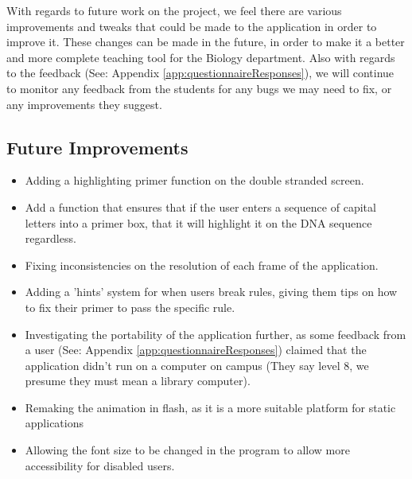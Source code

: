 
With regards to future work on the project, we feel there are various improvements and tweaks that could be made to the application in order to improve it. These changes can be made in the future, in order to make it a better and more complete teaching tool for the Biology department. Also with regards to the feedback (See: Appendix \ref{app:questionnaireResponses}), we will continue to monitor any feedback from the students for any bugs we may need to fix, or any improvements they suggest.

\subsection{Future Improvements}

\begin{itemize}

\item Adding a highlighting primer function on the double stranded screen.

\item Add a function that ensures that if the user enters a sequence of capital letters into a primer box, that it will highlight it on the DNA sequence regardless.

\item Fixing inconsistencies on the resolution of each frame of the application.

\item Adding a 'hints' system for when users break rules, giving them tips on how to fix their primer to pass the specific rule.

\item Investigating the portability of the application further, as some feedback from a user (See: Appendix \ref{app:questionnaireResponses}) claimed that the application didn't run on a computer on campus (They say level 8, we presume they must mean a library computer).

\item Remaking the animation in flash, as it is a more suitable platform for static applications

\item Allowing the font size to be changed in the program to allow more accessibility for disabled users.

 

\end{itemize}












